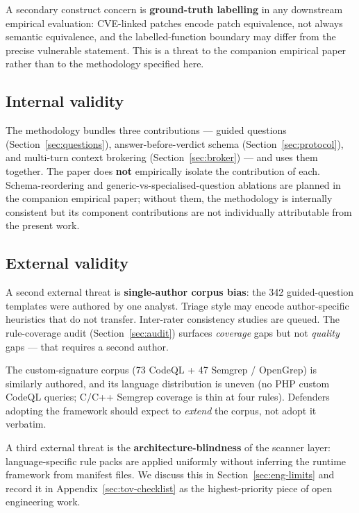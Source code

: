 \documentclass[11pt,a4paper]{article}
\begin{document}
A secondary construct concern is \textbf{ground-truth labelling} in
any downstream empirical evaluation: CVE-linked patches encode patch
equivalence, not always semantic equivalence, and the labelled-function
boundary may differ from the precise vulnerable statement. This is a
threat to the companion empirical paper rather than to the methodology
specified here.

\subsection{Internal validity}

The methodology bundles three contributions --- guided questions
(Section~\ref{sec:questions}), answer-before-verdict schema
(Section~\ref{sec:protocol}), and multi-turn context brokering
(Section~\ref{sec:broker}) --- and uses them together. The paper does
\textbf{not} empirically isolate the contribution of each.
Schema-reordering and generic-vs-specialised-question ablations are
planned in the companion empirical paper; without them, the
methodology is internally consistent but its component contributions
are not individually attributable from the present work.

\subsection{External validity}
\label{sec:external-validity}

A second external threat is \textbf{single-author corpus bias}: the
342 guided-question templates were authored by one analyst. Triage
style may encode author-specific heuristics that do not transfer.
Inter-rater consistency studies are queued. The rule-coverage audit
(Section~\ref{sec:audit}) surfaces \emph{coverage} gaps but not
\emph{quality} gaps --- that requires a second author.

The custom-signature corpus (73 CodeQL + 47 Semgrep / OpenGrep) is
similarly authored, and its language distribution is uneven (no PHP
custom CodeQL queries; C/C++ Semgrep coverage is thin at four rules).
Defenders adopting the framework should expect to \emph{extend} the
corpus, not adopt it verbatim.

A third external threat is the \textbf{architecture-blindness} of the
scanner layer: language-specific rule packs are applied uniformly
without inferring the runtime framework from manifest files. We
discuss this in Section~\ref{sec:eng-limits} and record it in
Appendix~\ref{sec:tov-checklist} as the highest-priority piece of open
engineering work.
\end{document}
